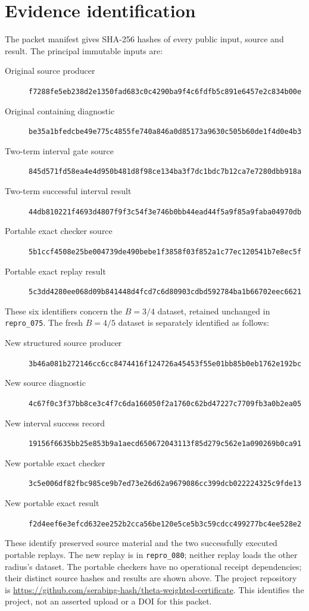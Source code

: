 \documentclass[11pt]{article}
\begin{document}
\section{Evidence identification}
The packet manifest gives SHA-256 hashes of every public input, source and result. The principal immutable inputs are:
\begin{description}
\item[Original source producer] \nolinkurl{f7288fe5eb238d2e1350fad683c0c4290ba9f4c6fdfb5c891e6457e2c834b00e}
\item[Original containing diagnostic] \nolinkurl{be35a1bfedcbe49e775c4855fe740a846a0d85173a9630c505b60de1f4d0e4b3}
\item[Two-term interval gate source] \nolinkurl{845d571fd58ea4e4d950b481d8f98ce134ba3f7dc1bdc7b12ca7e7280dbb918a}
\item[Two-term successful interval result] \nolinkurl{44db810221f4693d4807f9f3c54f3e746b0bb44ead44f5a9f85a9faba04970db}
\item[Portable exact checker source] \nolinkurl{5b1ccf4508e25be004739de490bebe1f3858f03f852a1c77ec120541b7e8ec5f}
\item[Portable exact replay result] \nolinkurl{5c3dd4280ee068d09b841448d4fcd7c6d80903cdbd592784ba1b66702eec6621}
\end{description}
These six identifiers concern the $B=3/4$ dataset, retained unchanged in \texttt{repro\_075}. The fresh $B=4/5$ dataset is separately identified as follows:
\begin{description}
\item[New structured source producer] \nolinkurl{3b46a081b272146cc6cc8474416f124726a45453f55e01bb85b0eb1762e192bc}
\item[New source diagnostic] \nolinkurl{4c67f0c3f37bb8ce3c4f7c6da166050f2a1760c62bd47227c7709fb3a0b2ea05}
\item[New interval success record] \nolinkurl{19156f6635bb25e853b9a1aecd650672043113f85d279c562e1a090269b0ca91}
\item[New portable exact checker] \nolinkurl{3c5e006df82fbc985ce9b7ed73e26d62a9679086cc399dcb022224325c9fde13}
\item[New portable exact result] \nolinkurl{f2d4eef6e3efcd632ee252b2cca56be120e5ce5b3c59cdcc499277bc4ee528e2}
\end{description}
These identify preserved source material and the two successfully executed portable replays. The new replay is in \texttt{repro\_080}; neither replay loads the other radius's dataset. The portable checkers have no operational receipt dependencies; their distinct source hashes and results are shown above. The project repository is \url{https://github.com/serabing-hash/theta-weighted-certificate}. This identifies the project, not an asserted upload or a DOI for this packet.
\end{document}

